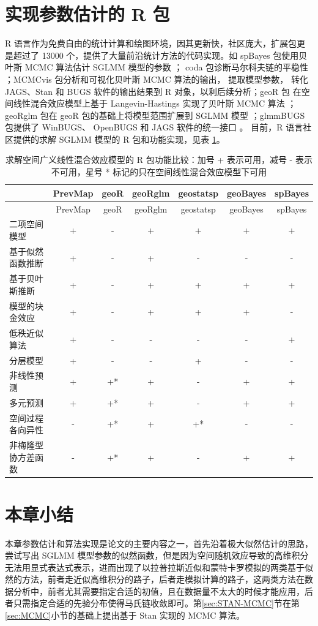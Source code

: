 \documentclass[12pt,a4paper,UTF8,twoside]{book}
\theoremstyle{definition}
\theoremstyle{definition}
\theoremstyle{definition}
\theoremstyle{remark}
\begin{document}
\hypertarget{subsec:sglmm-with-r}{%
\section{实现参数估计的 R 包}\label{subsec:sglmm-with-r}}

R
语言作为免费自由的统计计算和绘图环境，因其更新快，社区庞大，扩展包更是超过了
13000 个，提供了大量前沿统计方法的代码实现。如 spBayes 包使用贝叶斯 MCMC
算法估计 SGLMM 模型的参数 \citep{spBayes2015}； coda
包诊断马尔科夫链的平稳性 \citep{coda2006}；MCMCvis 包分析和可视化贝叶斯
MCMC 算法的输出， 提取模型参数， 转化 JAGS、Stan 和 BUGS
软件的输出结果到 R 对象，以利后续分析；geoR 包
在空间线性混合效应模型上基于 Langevin-Hastings 实现了贝叶斯 MCMC 算法
\citep{geoR2001}；geoRglm 包在 geoR 包的基础上将模型范围扩展到 SGLMM
模型 \citep{geoRglm2002}；glmmBUGS 包提供了 WinBUGS、 OpenBUGS 和 JAGS
软件的统一接口 \citep{glmmBUGS2010MCMC}。 目前，R 语言社区提供的求解
SGLMM 模型的 R 包和功能实现，见表 \ref{tab:sglmm-packages}。

\begin{longtable}[]{@{}lcccccc@{}}
\caption{\label{tab:sglmm-packages} 求解空间广义线性混合效应模型的 R
包功能比较：加号 + 表示可用，减号 - 表示不可用，星号 *
标记的只在空间线性混合效应模型下可用}\tabularnewline
\toprule
& PrevMap & geoR & geoRglm & geostatsp & geoBayes &
spBayes\tabularnewline
\midrule
\endfirsthead
\toprule
& PrevMap & geoR & geoRglm & geostatsp & geoBayes &
spBayes\tabularnewline
\midrule
\endhead
二项空间模型 & + & - & + & + & + & +\tabularnewline
基于似然函数推断 & + & - & + & - & - & -\tabularnewline
基于贝叶斯推断 & + & - & + & + & + & +\tabularnewline
模型的块金效应 & + & - & + & + & + & -\tabularnewline
低秩近似算法 & + & - & - & - & - & +\tabularnewline
分层模型 & + & - & - & + & - & -\tabularnewline
非线性预测 & + & +* & + & - & + & +\tabularnewline
多元预测 & + & +* & + & - & + & +\tabularnewline
空间过程各向异性 & - & +* & + & +* & - & -\tabularnewline
非梅隆型协方差函数 & - & +* & + & - & + & +\tabularnewline
\bottomrule
\end{longtable}

\hypertarget{sec:estimations}{%
\section{本章小结}\label{sec:estimations}}

本章参数估计和算法实现是论文的主要内容之一，首先沿着极大似然估计的思路，尝试写出
SGLMM
模型参数的似然函数，但是因为空间随机效应导致的高维积分无法用显式表达式表示，进而出现了以拉普拉斯近似和蒙特卡罗模拟的两类基于似然的方法，前者走近似高维积分的路子，后者走模拟计算的路子，这两类方法在数据分析中，前者尤其需要指定合适的初值，且在数据量不太大的时候才能应用，后者只需指定合适的先验分布使得马氏链收敛即可。第\ref{sec:STAN-MCMC}节在第\ref{sec:MCMC}小节的基础上提出基于
Stan 实现的 MCMC 算法。
\end{document}
